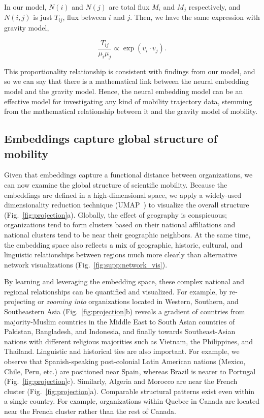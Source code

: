 \documentclass[12pt]{article} %
\begin{document}
In our model, $N(i)$ and $N(j)$ are total flux $M_i$ and $M_j$ respectively,  and $N(i,j)$ is just  $T_{ij}$, flux between $i$ and $j$. Then, we have the same expression with gravity model,

\begin{equation}
    \label{eq:sgns_relation_w,i, w_j_combining}
     \frac{T_{ij}}{\mu_{i} \mu_{j}}  \propto  \exp(v_{i} \cdot v_{j} ).
\end{equation}

This proportionality relationship is consistent with findings from our model, and so we can say that there is a mathematical link between the neural embedding model and the gravity model. Hence, the neural embedding model can be an effective model for investigating any kind of mobility trajectory data, stemming from the mathematical relationship between it and the gravity model of mobility.


%
%
\subsection*{Embeddings capture global structure of mobility}

Given that embeddings capture a functional distance between organizations, we can now examine the global structure of scientific mobility.
Because the embeddings are defined in a high-dimensional space, we apply a widely-used dimensionality reduction technique (UMAP~\autocite{mcinnes2018umap}) to visualize the overall structure (Fig.~\ref{fig:projection}a).
Globally, the effect of geography is conspicuous; organizations tend to form clusters based on their national affiliations and national clusters tend to be near their geographic neighbors. 
At the same time, the embedding space also reflects a mix of geographic, historic, cultural, and linguistic relationships between regions much more clearly than alternative network visualizations (Fig.~\ref{fig:supp:network_vis}). 

By learning and leveraging the embedding space, these complex national and regional relationships can be quantified and visualized.  
For example, by re-projecting or \textit{zooming into} organizations located in Western, Southern, and Southeastern Asia (Fig.~\ref{fig:projection}b) reveals a gradient of countries from majority-Muslim countries in the Middle East to South Asian countries of Pakistan, Bangladesh, and Indonesia, and finally towards Southeast-Asian nations with different religious majorities such as Vietnam, the Philippines, and Thailand.
Linguistic and historical ties are also important.
For example, we observe that Spanish-speaking post-colonial Latin American nations (Mexico, Chile, Peru, etc.) are positioned near Spain, whereas Brazil is nearer to Portugal (Fig.~\ref{fig:projection}c).
Similarly, Algeria and Morocco are near the French cluster (Fig.~\ref{fig:projection}a).
Comparable structural patterns exist even within a single country.
For example, organizations within Quebec in Canada are located near the French cluster rather than the rest of Canada.
\end{document}
